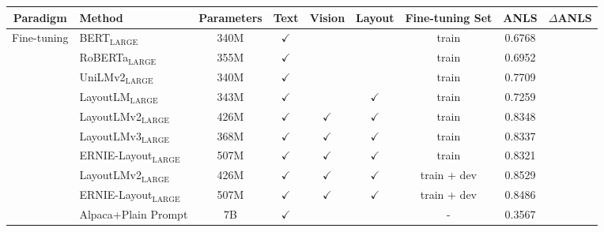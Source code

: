 \documentclass[letterpaper]{article} \usepackage{aaai24_preprint}  \usepackage{times}  \usepackage{helvet}  \usepackage{courier}  \usepackage[hyphens]{url}  \usepackage{graphicx} \urlstyle{rm} \def\UrlFont{\rm}  \usepackage{natbib}  \usepackage{caption} \frenchspacing  \setlength{\pdfpagewidth}{8.5in} \setlength{\pdfpageheight}{11in} \usepackage{algorithm}
\begin{document}
\begin{table*}[t]
\small
\centering
\begin{tabular}{@{}clccccccc@{}}
\toprule
Paradigm                      & Method                                   & Parameters               & Text         & Vision       & Layout       & Fine-tuning Set & ANLS   & $\Delta$ANLS \\ \midrule
\multirow{12}{*}{Fine-tuning} & BERT$_\text{LARGE}$                    & 340M                     &$\checkmark$ &              &              & train           & 0.6768 &              \\
                              & RoBERTa$_\text{LARGE}$                   & 355M                     & $\checkmark$ &              &              & train           & 0.6952 &              \\
                              & UniLMv2$_\text{LARGE}$                   & 340M                     & $\checkmark$ &              &              & train           & 0.7709 &              \\ \cmidrule(l){2-9} 
                              & LayoutLM$_\text{LARGE}$                 & 343M                     & $\checkmark$ &              & $\checkmark$ & train           & 0.7259 &              \\
                              & LayoutLMv2$_\text{LARGE}$      & 426M                     & $\checkmark$ & $\checkmark$ & $\checkmark$ & train           & 0.8348 &              \\
                              & LayoutLMv3$_\text{LARGE}$                & 368M                     & $\checkmark$ & $\checkmark$ & $\checkmark$ & train           & 0.8337 &              \\
                              & ERNIE-Layout$_\text{LARGE}$              & 507M                     & $\checkmark$ & $\checkmark$ & $\checkmark$ & train           & 0.8321 &              \\
& LayoutLMv2$_\text{LARGE}$          & 426M                     & $\checkmark$ & $\checkmark$ & $\checkmark$ & train + dev     & 0.8529 &              \\
                              & ERNIE-Layout$_\text{LARGE}$              & 507M                     & $\checkmark$ & $\checkmark$ & $\checkmark$ & train + dev     & 0.8486 &              \\
\midrule
\multirow{7}{*}{Zero-shot}    & Alpaca+Plain Prompt                    & \multirow{2}{*}{7B}      & $\checkmark$ &              &              & -               & 0.3567 &              \\

\end{tabular}
\end{table*}
\end{document}
